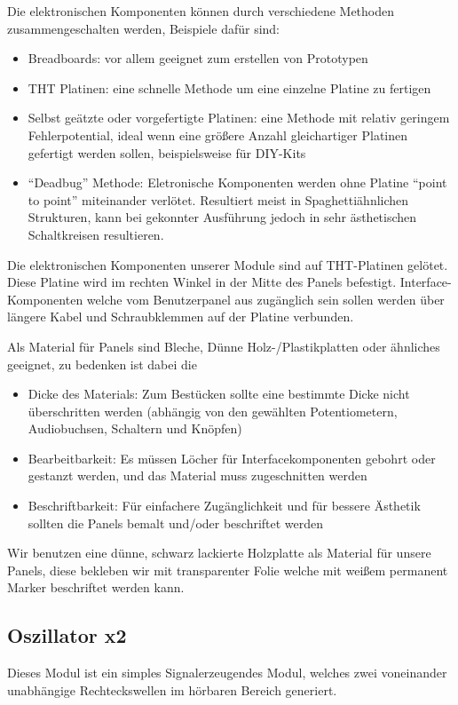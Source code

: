 Die elektronischen Komponenten können durch verschiedene Methoden zusammengeschalten werden, Beispiele dafür sind:
\begin{itemize}
\item Breadboards:
vor allem geeignet zum erstellen von Prototypen
\item THT Platinen:
eine schnelle Methode um eine einzelne Platine zu fertigen
\item Selbst geätzte oder vorgefertigte Platinen:
eine Methode mit relativ geringem Fehlerpotential, ideal wenn eine größere Anzahl gleichartiger Platinen gefertigt werden sollen, beispielsweise für DIY-Kits
\item "`Deadbug"' Methode:
Eletronische Komponenten werden ohne Platine "`point to point"' miteinander verlötet. Resultiert meist in Spaghettiähnlichen Strukturen, kann bei gekonnter Ausführung jedoch in sehr ästhetischen Schaltkreisen resultieren.
\end{itemize}

Die elektronischen Komponenten unserer Module sind auf THT-Platinen gelötet. Diese Platine wird im rechten Winkel in der Mitte des Panels befestigt. Interface-Komponenten welche vom Benutzerpanel aus zugänglich sein sollen werden über längere Kabel und Schraubklemmen auf der Platine verbunden.

Als Material für Panels sind Bleche, Dünne Holz-/Plastikplatten oder ähnliches geeignet, zu bedenken ist dabei die 

\begin{itemize}
\item Dicke des Materials:
Zum Bestücken sollte eine bestimmte Dicke nicht überschritten werden (abhängig von den gewählten Potentiometern, Audiobuchsen, Schaltern und Knöpfen)
\item Bearbeitbarkeit:
Es müssen Löcher für Interfacekomponenten gebohrt oder gestanzt werden, und das Material muss zugeschnitten werden
\item Beschriftbarkeit:
Für einfachere Zugänglichkeit und für bessere Ästhetik sollten die Panels bemalt und/oder beschriftet werden
\end{itemize}

Wir benutzen eine dünne, schwarz lackierte Holzplatte als Material für unsere Panels, diese bekleben wir mit transparenter Folie welche mit weißem permanent Marker beschriftet werden kann.

\subsection{Oszillator x2}
\label{sec:org7e45dce}
Dieses Modul ist ein simples Signalerzeugendes Modul, welches zwei voneinander unabhängige Rechteckswellen im hörbaren Bereich generiert.


